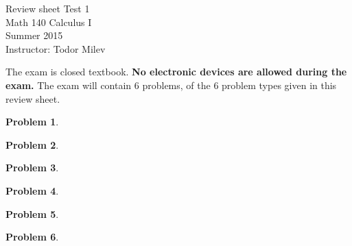 \documentclass{article}
\newtheorem{problem}{Problem}
\begin{document}
\begin{center}
\Large
Review sheet Test 1 \\ Math 140 Calculus I \\ \normalsize Summer 2015 \\ Instructor: Todor Milev
\end{center}



\noindent The exam is closed textbook. \textbf{No electronic devices are allowed during the exam. } The exam will contain 6 problems, of the 6 problem types given in this review sheet. %

\begin{problem}

\end{problem}

\begin{problem}

\end{problem}

\begin{problem}

\end{problem}
\begin{problem}

\end{problem}

\begin{problem}

\end{problem}


\begin{problem}

\end{problem}


\end{document}
